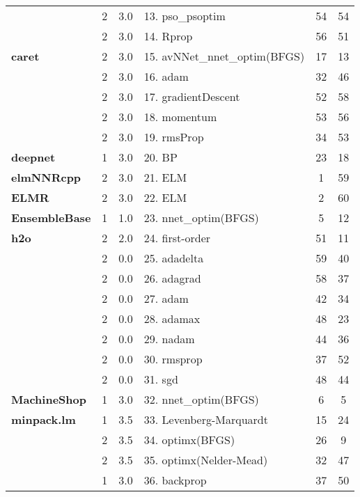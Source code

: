 \begin{Schunk}
\begin{table}
\begin{tabular}[t]{>{\bfseries}lcclcc}
 & 2 & 3.0 & 13. pso\_psoptim & 54 & 54\\

\multirow{-3}{*}{\raggedright\arraybackslash CaDENCE} & 2 & 3.0 & 14. Rprop & 56 & 51\\
\cmidrule{1-6}
caret & 2 & 3.0 & 15. avNNet\_nnet\_optim(BFGS) & 17 & 13\\
\cmidrule{1-6}
 & 2 & 3.0 & 16. adam & 32 & 46\\

 & 2 & 3.0 & 17. gradientDescent & 52 & 58\\

 & 2 & 3.0 & 18. momentum & 53 & 56\\

\multirow{-4}{*}{\raggedright\arraybackslash deepdive} & 2 & 3.0 & 19. rmsProp & 34 & 53\\
\cmidrule{1-6}
deepnet & 1 & 3.0 & 20. BP & 23 & 18\\
\cmidrule{1-6}
elmNNRcpp & 2 & 3.0 & 21. ELM & 1 & 59\\
\cmidrule{1-6}
ELMR & 2 & 3.0 & 22. ELM & 2 & 60\\
\cmidrule{1-6}
EnsembleBase & 1 & 1.0 & 23. nnet\_optim(BFGS) & 5 & 12\\
\cmidrule{1-6}
h2o & 2 & 2.0 & 24. first-order & 51 & 11\\
\cmidrule{1-6}
 & 2 & 0.0 & 25. adadelta & 59 & 40\\

 & 2 & 0.0 & 26. adagrad & 58 & 37\\

 & 2 & 0.0 & 27. adam & 42 & 34\\

 & 2 & 0.0 & 28. adamax & 48 & 23\\

 & 2 & 0.0 & 29. nadam & 44 & 36\\

 & 2 & 0.0 & 30. rmsprop & 37 & 52\\

\multirow{-7}{*}{\raggedright\arraybackslash keras} & 2 & 0.0 & 31. sgd & 48 & 44\\
\cmidrule{1-6}
MachineShop & 1 & 3.0 & 32. nnet\_optim(BFGS) & 6 & 5\\
\cmidrule{1-6}
minpack.lm & 1 & 3.5 & 33. Levenberg-Marquardt & 15 & 24\\
\cmidrule{1-6}
 & 2 & 3.5 & 34. optimx(BFGS) & 26 & 9\\

\multirow{-2}{*}{\raggedright\arraybackslash monmlp} & 2 & 3.5 & 35. optimx(Nelder-Mead) & 32 & 47\\
\cmidrule{1-6}
 & 1 & 3.0 & 36. backprop & 37 & 50\\


\end{tabular}
\end{table}
\end{Schunk}
